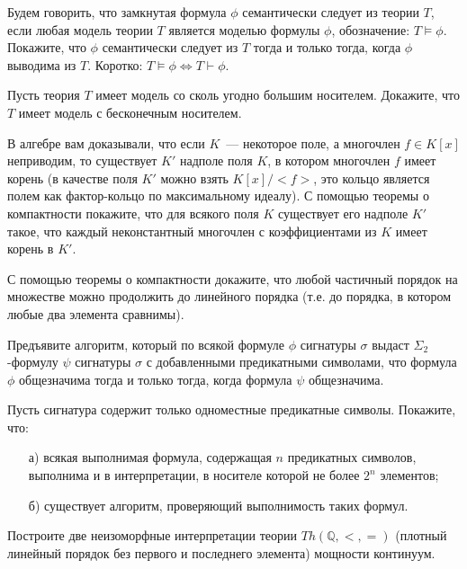 
\begin{task}
	Будем говорить, что замкнутая формула $\phi$ семантически следует из теории $T$, если любая модель теории $T$
    является моделью формулы $\phi$, обозначение: $T\models \phi$. Покажите, что $\phi$ семантически следует из $T$
    тогда и только тогда, когда $\phi$ выводима из $T$. Коротко: $T \models \phi \iff T \vdash \phi$. 
\end{task}


\begin{task}
    Пусть теория $T$ имеет модель со сколь угодно большим носителем. Докажите, что $T$ имеет модель с бесконечным
    носителем.
\end{task}


\begin{task}
    В алгебре вам доказывали, что если $K$~--- некоторое поле, а многочлен $f \in K[x]$ неприводим, то существует $K'$
    надполе поля $K$, в котором многочлен $f$ имеет корень (в качестве поля $K'$ можно взять $K[x] / {<}f{>}$, это
    кольцо является полем как фактор-кольцо по максимальному идеалу). С помощью теоремы о компактности покажите, что для
    всякого поля $K$ существует его надполе $K'$ такое, что каждый неконстантный многочлен с коэффициентами из $K$ имеет
    корень в $K'$.
\end{task}

\begin{task}
    С помощью теоремы о компактности докажите, что любой частичный порядок на множестве можно продолжить до линейного
    порядка (т.е. до порядка, в котором любые два элемента сравнимы).
\end{task}


\begin{task}
	Предъявите алгоритм, который по всякой формуле $\phi$ сигнатуры $\sigma$ выдаст $\Sigma_2$-формулу $\psi$ сигнатуры
    $\sigma$ с добавленными предикатными символами, что формула $\phi$ общезначима тогда и только тогда, когда формула
    $\psi$ общезначима.
\end{task}


\breakline


\begin{ptask}{59}
	Пусть сигнатура содержит только одноместные предикатные символы. Покажите, что:
    \begin{enumerate}[topsep = 0pt, itemsep = -1ex]
        \item [а)] всякая выполнимая формула, содержащая $n$ предикатных символов, выполнима и в интерпретации, в
			носителе которой не более $2^n$ элементов;
        \item [б)] существует алгоритм, проверяющий выполнимость таких формул.
    \end{enumerate}
\end{ptask}


\begin{ptask}{63}
    Построите две неизоморфные интерпретации теории $Th(\mathbb{Q}, <, =)$ (плотный линейный порядок без первого и
    последнего элемента) мощности континуум.
\end{ptask}
